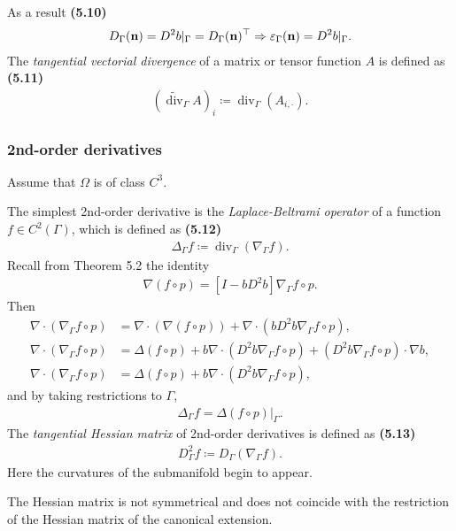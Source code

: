 \documentclass[oneside]{book}
\numberwithin{equation}{section}
\begin{document}
As a result \textbf{(5.10)}
\begin{align*}
    D_\Gamma({\bf n}) = D^2b|_\Gamma = D_\Gamma({\bf n})^\top\Rightarrow\varepsilon_\Gamma({\bf n}) = D^2b|_\Gamma.
\end{align*}
The \textit{tangential vectorial divergence} of a matrix or tensor function $A$ is defined as \textbf{(5.11)}
\begin{align*}
    (\tilde{\operatorname{div}}_\Gamma A)_i\coloneqq\operatorname{div}_\Gamma(A_{i,\cdot}).
\end{align*}

\subsubsection{2nd-order derivatives}
Assume that $\Omega$ is of class $C^3$.

The simplest 2nd-order derivative is the \textit{Laplace-Beltrami operator} of a function $f\in C^2(\Gamma)$, which is defined as \textbf{(5.12)}
\begin{align*}
    \Delta_\Gamma f\coloneqq\operatorname{div}_\Gamma\left(\nabla_\Gamma f\right).
\end{align*}
Recall from Theorem 5.2 the identity
\begin{align*}
    \nabla(f\circ p) = [I - bD^2b]\nabla_\Gamma f\circ p.
\end{align*}
Then
\begin{align*}
    \nabla\cdot(\nabla_\Gamma f\circ p) &= \nabla\cdot(\nabla(f\circ p)) + \nabla\cdot\left(bD^2b\nabla_\Gamma f\circ p\right),\\
    \nabla\cdot(\nabla_\Gamma f\circ p) &= \Delta(f\circ p) + b\nabla\cdot(D^2b\nabla_\Gamma f\circ p) + \left(D^2b\nabla_\Gamma f\circ p\right)\cdot\nabla b,\\
    \nabla\cdot(\nabla_\Gamma f\circ p) &= \Delta(f\circ p) + b\nabla\cdot\left(D^2b\nabla_\Gamma f\circ p\right),
\end{align*}
and by taking restrictions to $\Gamma$,
\begin{align*}
    \Delta_\Gamma f = \Delta(f\circ p)|_\Gamma.
\end{align*}
The \textit{tangential Hessian matrix} of 2nd-order derivatives is defined as \textbf{(5.13)}
\begin{align*}
    D_\Gamma^2 f\coloneqq D_\Gamma(\nabla_\Gamma f).
\end{align*}
Here the curvatures of the submanifold begin to appear.

The Hessian matrix is not symmetrical and does not coincide with the restriction of the Hessian matrix of the canonical extension.
\end{document}
